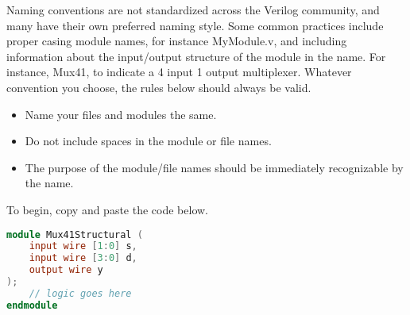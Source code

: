\documentclass[12pt]{journal}
\begin{document}
\begin{extra}[frametitle={Naming Conventions}]
    Naming conventions are not standardized across the Verilog community, and many have their own preferred naming style. Some common practices include proper casing module names, for instance MyModule.v, and including information about the input/output structure of the module in the name. For instance, Mux41, to indicate a 4 input 1 output multiplexer. Whatever convention you choose, the rules below should always be valid.
\begin{itemize}
    \item Name your files and modules the same.
    \item Do not include spaces in the module or file names.
    \item The purpose of the module/file names should be immediately recognizable by the name.
\end{itemize}
\end{extra}

To begin, copy and paste the code below.

\begin{lstlisting}[language=Verilog]
module Mux41Structural (
    input wire [1:0] s, 
    input wire [3:0] d,
    output wire y
);
    // logic goes here
endmodule
\end{lstlisting}
\end{document}

